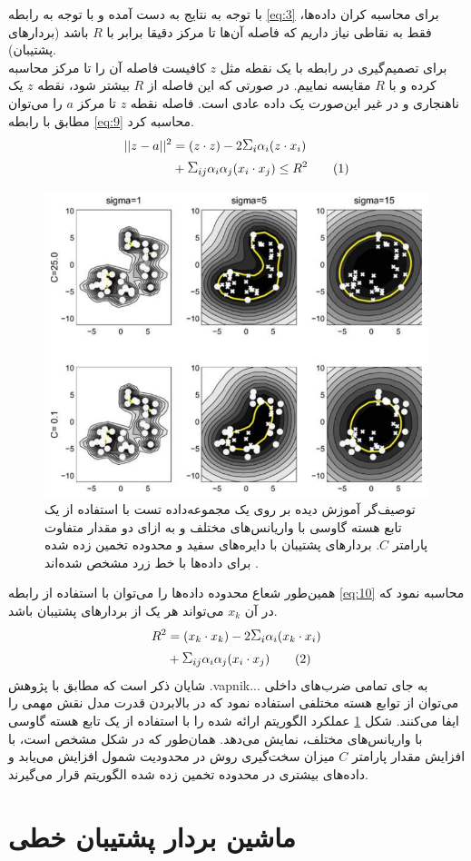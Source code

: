 \documentclass[twocolumn]{article}
\newcommand\numberthis[1][]{%
    \refstepcounter{equation}%
    \ifx#1\empty\else\label{eq:#1}\fi%
    \tag{\theequation}%
}
\begin{document}
با توجه به نتایج به دست آمده و با توجه به رابطه \eqref{eq:3} برای محاسبه کران داده‌ها، فقط به نقاطی نیاز داریم که فاصله آن‌ها تا مرکز دقیقا برابر با $R$ باشد (بردارهای پشتیبان).
\\
برای تصمیم‌گیری در رابطه با یک نقطه مثل $z$ کافیست فاصله آن را تا مرکز محاسبه کرده و با $R$ مقایسه نماییم. در صورتی که این فاصله از $R$ بیشتر شود،‌ نقطه $z$ یک ناهنجاری و در غیر این‌صورت یک داده عادی است. فاصله نقطه $z$ تا مرکز $a$ را می‌توان مطابق با رابطه \eqref{eq:9} محاسبه کرد.
\begin{align*}
||z-a||^2 &= (z\cdot z)-2\mathlarger{\Sigma_i}\alpha_i (z \cdot x_i) \\&+ \mathlarger{\Sigma_{ij}} \alpha_i \alpha_j (x_i \cdot x_j) \leq R^2
\numberthis 
\label{eq:9}
\end{align*}
\begin{figure}[h]
\centering
\includegraphics[scale=0.6]{Imgs/svdd1.png}
\caption{توصیف‌گر آموزش دیده بر روی یک مجموعه‌داده تست با استفاده از یک تابع هسته گاوسی با واریانس‌های مختلف و به ازای دو مقدار متفاوت پارامتر $C$. بردارهای پشتیبان با دایره‌های سفید و محدوده تخمین‌ زده شده برای داده‌ها با خط زرد مشخص شده‌اند \cite{tax2004support}.}
\label{fig:1}
\end{figure}

همین‌طور شعاع محدوده داده‌ها را می‌توان با استفاده از رابطه \eqref{eq:10} محاسبه نمود که در آن $x_k$ می‌تواند هر یک از بردارهای پشتیبان باشد.
\begin{align*}
R^2 &= (x_k\cdot x_k)-2\mathlarger{\Sigma_i}\alpha_i (x_k \cdot x_i) \\&+ \mathlarger{\Sigma_{ij}} \alpha_i \alpha_j (x_i \cdot x_j)
\numberthis 
\label{eq:10}
\end{align*}
شایان ذکر است که مطابق با پژوهش .vapnik... به جای تمامی ضرب‌های داخلی می‌توان از توابع هسته مختلفی استفاده نمود که در بالابردن قدرت مدل نقش مهمی را ایفا می‌کنند. شکل 
\ref{fig:1}
عملکرد الگوریتم ارائه شده را با استفاده از یک تابع هسته گاوسی با واریانس‌های مختلف، نمایش می‌دهد. همان‌طور که در شکل مشخص است،‌ با افزایش مقدار پارامتر $C$ میزان سخت‌گیری روش در محدودیت شمول افزایش می‌یابد و داده‌های بیشتری در محدوده تخمین‌ زده شده الگوریتم قرار می‌گیرند.

\section{ماشین بردار پشتیبان خطی}




\end{document}
